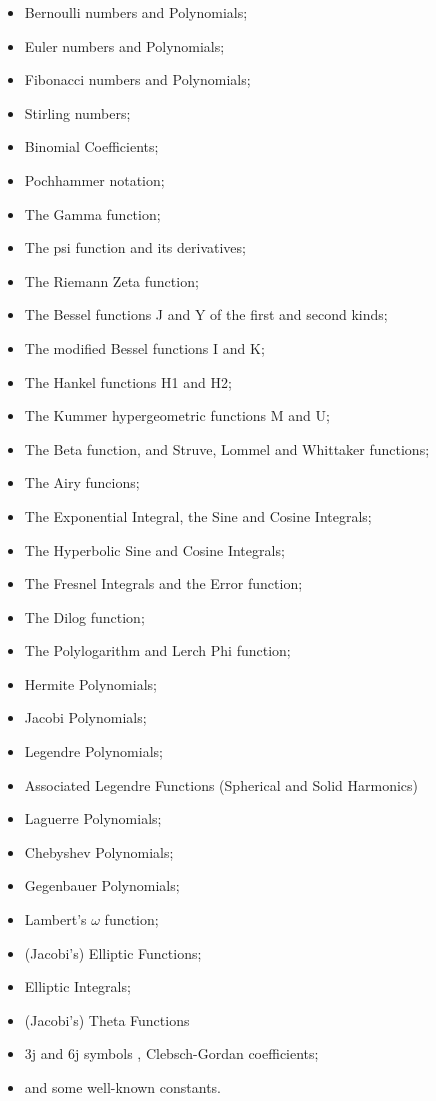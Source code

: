 \begin{itemize}
\item Bernoulli numbers and Polynomials;
\item Euler numbers and Polynomials;
\item Fibonacci numbers and Polynomials;
\item Stirling numbers;
\item Binomial Coefficients;
\item Pochhammer notation;
\item The Gamma function;
\item The psi function and its derivatives;
\item The Riemann Zeta function;
\item The Bessel functions J and Y of the first and second kinds;
\item The modified Bessel functions I and K;
\item The Hankel functions H1 and H2;
\item The Kummer hypergeometric functions M and U;
\item The Beta function, and Struve, Lommel and Whittaker functions;
\item The Airy funcions;
\item The Exponential Integral, the Sine and Cosine Integrals;
\item The Hyperbolic Sine and Cosine Integrals;
\item The Fresnel Integrals and the Error function;
\item The Dilog function;
\item The Polylogarithm and Lerch Phi function;
\item Hermite Polynomials;
\item Jacobi Polynomials;
\item Legendre Polynomials;
\item Associated Legendre Functions (Spherical and Solid Harmonics)
\item Laguerre Polynomials;
\item Chebyshev Polynomials;
\item Gegenbauer Polynomials;
\item Lambert's $\omega$ function;
\item (Jacobi's) Elliptic Functions;
\item Elliptic Integrals;
\item (Jacobi's) Theta Functions
\item 3j and 6j symbols , Clebsch-Gordan coefficients;
\item and some well-known constants.
\end{itemize}

